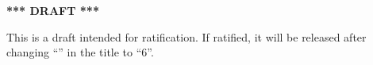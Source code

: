 \begin{center}
{\large \bf
*** DRAFT *** \\
}\end{center}

This is a draft intended for ratification.  If ratified, it will
be released after changing ``\rnrsrevision{}'' in the title to ``6''.

